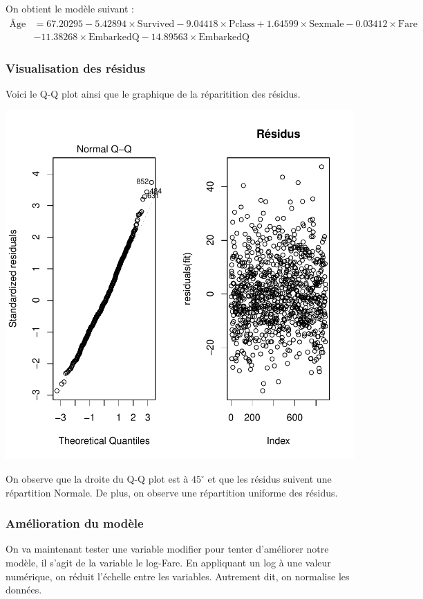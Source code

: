 \documentclass[11pt,french]{report}
\begin{document}
On obtient le modèle suivant :
\begin{align*}
\text{Âge} &= 67.20295 - 5.42894 \times \text{Survived} - 9.04418 \times \text{Pclass} + 1.64599  \times \text{Sexmale} -0.03412 \times \text{Fare} \\
&- 11.38268  \times \text{EmbarkedQ} - 14.89563 \times \text{EmbarkedQ}
\end{align*}
\subsubsection{Visualisation des résidus}
\bigskip
Voici le Q-Q plot ainsi que le graphique de la réparitition des résidus.
\bigskip

\includegraphics{notes_de_cours-042}

\bigskip
On observe que la droite du Q-Q plot est à $45^\circ$ et que les résidus suivent une répartition Normale. De plus, on observe une répartition uniforme des résidus.

\subsubsection{Amélioration du modèle}
On va maintenant tester une variable modifier pour tenter d'améliorer notre modèle, il s'agit de la variable le log-Fare. En appliquant un log à une valeur numérique, on réduit l'échelle entre les variables. Autrement dit, on normalise les données.
\end{document}
